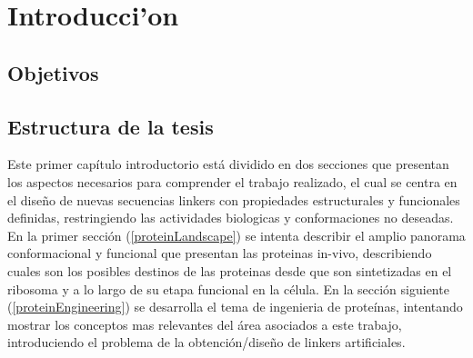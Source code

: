 \chapter{Introducci'on}
% 

\section{Objetivos}



\section{Estructura de la tesis}

Este primer capítulo introductorio está dividido en dos secciones que presentan los aspectos necesarios para comprender el trabajo realizado, el cual se centra en el diseño de nuevas secuencias linkers con 
propiedades estructurales y funcionales definidas, restringiendo las actividades biologicas y conformaciones no deseadas.
En la primer sección (\ref{proteinLandscape}) se intenta describir el amplio panorama conformacional y funcional que presentan las proteinas in-vivo, 
describiendo cuales son los posibles destinos de las proteinas desde que son sintetizadas en el ribosoma y a lo largo de su etapa funcional en la célula. 
En la sección siguiente (\ref{proteinEngineering}) se desarrolla el tema de ingenieria de proteínas, intentando mostrar los conceptos mas relevantes del área asociados a este trabajo, 
introduciendo el problema de la obtención/diseño de linkers artificiales.

